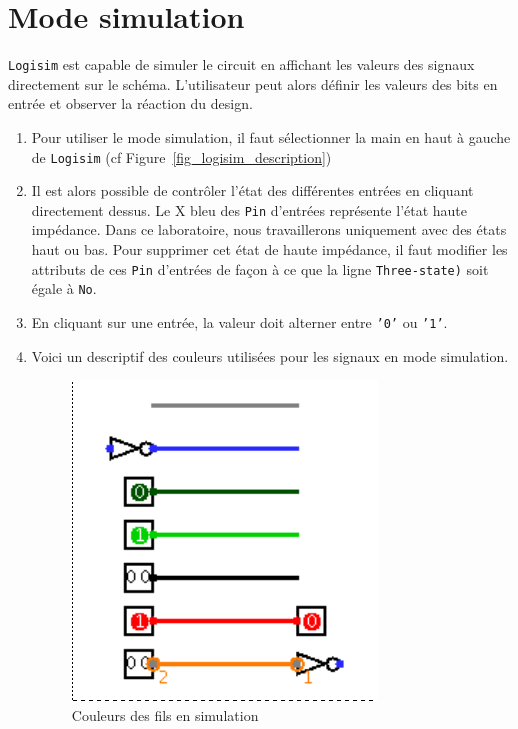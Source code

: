 \documentclass[nosolution]{exercice}
\begin{document}
\section{Mode simulation}
\texttt{Logisim} est capable de simuler le circuit en affichant les valeurs des signaux directement sur le schéma. L'utilisateur
peut alors définir les valeurs des bits en entrée et observer la réaction du design.
\begin{enumerate}
\item Pour utiliser le mode simulation, il faut sélectionner la main en haut à gauche de \texttt{Logisim} (cf
Figure~\ref{fig_logisim_description})

\item Il est alors possible de contrôler l'état des différentes entrées en cliquant directement dessus. Le X bleu des
\texttt{Pin} d'entrées représente l'état haute impédance.
Dans ce laboratoire, nous travaillerons uniquement avec des états haut ou bas. Pour supprimer cet état de haute
impédance, il faut modifier les attributs de ces \texttt{Pin} d'entrées de façon à ce que la ligne \texttt{Three-state)}
soit égale à \texttt{No}.

\item En cliquant sur une entrée, la valeur doit alterner entre \texttt{'0'} ou \texttt{'1'}.

\item Voici un descriptif des couleurs utilisées pour les signaux en mode simulation.
\begin{figure}[H]
\begin{center}
\includegraphics[scale=0.4]{images/logisim_couleurs.png}
\caption{\label{fig_logisim_couleur}Couleurs des fils en simulation}
\end{center}
\end{figure}


\end{enumerate}
\end{document}
